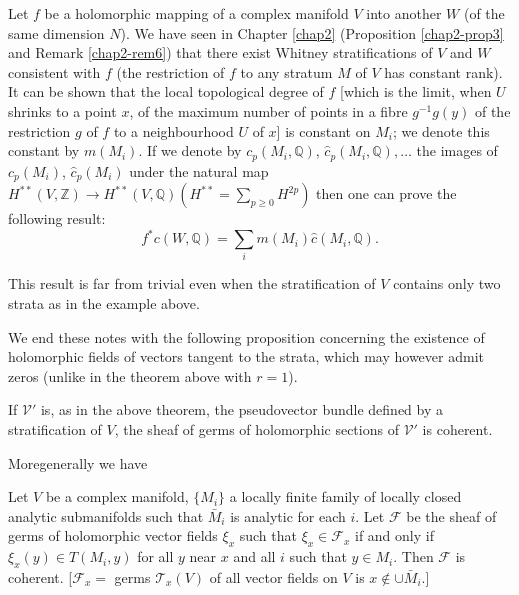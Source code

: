 Let $f$ be a holomorphic mapping of a complex manifold $V$ into
another $W$ (of the same dimension $N$). We have seen in Chapter
\ref{chap2} (Proposition \ref{chap2-prop3} and Remark
\ref{chap2-rem6}) that there exist Whitney stratifications of $V$ and
$W$ consistent with $f$ (the restriction of $f$ to any stratum $M$ of
$V$ has constant rank). It can be shown that the local topological
degree of $f$ [which is the limit, when $U$ shrinks to a point $x$, of
  the maximum number of points in a fibre $g^{-1}g(y)$ of the
  restriction $g$ of $f$ to a neighbourhood $U$ of $x$] is constant on
$M_{i}$; we denote this constant by $m(M_{i})$. If we denote by
$c_{p}(M_{i},\mathbb{Q})$, $\hat{c}_{p}(M_{i},\mathbb{Q}),\ldots$ the
images of $c_{p}(M_{i})$, $\hat{c}_{p}(M_{i})$ under the natural map
$H^{**}(V,\mathbb{Z})\to H^{**}(V,\mathbb{Q})(H^{**}=\sum_{p\geq
  0}H^{2p})$ then one can prove the following result:
$$
f^{*}c(W,\mathbb{Q})=\sum_{i}m(M_{i})\hat{c}(M_{i},\mathbb{Q}).
$$

This result is far from trivial even when the stratification of $V$
contains only two strata as in the example above.

We end these notes with the following proposition concerning the
existence of holomorphic fields of vectors tangent to the strata,
which may however admit zeros (unlike in the theorem above with
$r=1$).

\begin{prop*}[(R. Narasimhan).]
If $\mathscr{V}'$ is, as in the above theorem, the pseudovector bundle
defined by a stratification of $V$, the sheaf of germs of holomorphic
sections of $\mathscr{V}'$ is coherent.
\end{prop*}

More\pageoriginale generally we have

\begin{prop*}
Let $V$ be a complex manifold, $\{M_{i}\}$ a locally finite family of
locally closed analytic submanifolds such that $\bar{M}_{i}$ is
analytic for each $i$. Let $\mathscr{F}$ be the sheaf of germs of
holomorphic vector fields $\xi_{x}$ such that $\xi_{x}\in
\mathscr{F}_{x}$ if and only if $\xi_{x}(y)\in T(M_{i},y)$ for all $y$
near $x$ and all $i$ such that $y\in M_{i}$. Then $\mathscr{F}$ is
coherent. [$\mathscr{F}_{x}=$ germs $\mathscr{T}_{x}(V)$ of all vector
  fields on $V$ is $x\not\in \cup \bar{M}_{i}$.]
\end{prop*}

